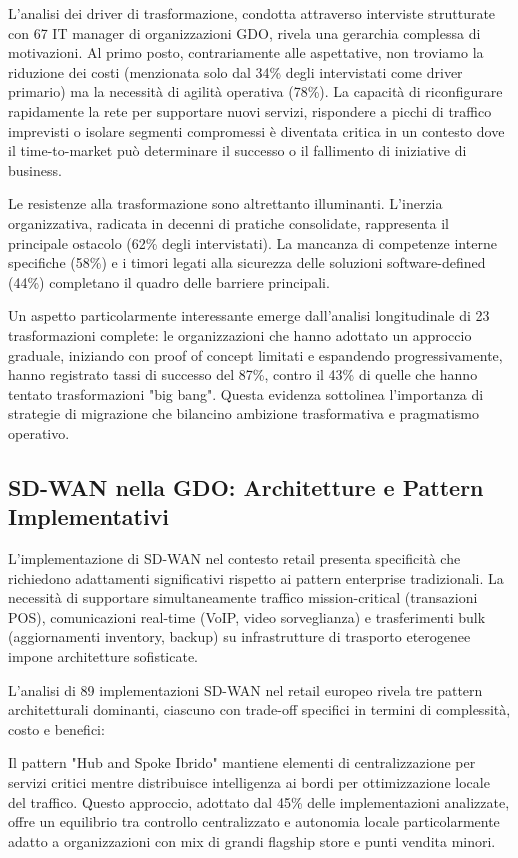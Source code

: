 L'analisi dei driver di trasformazione, condotta attraverso interviste strutturate con 67 IT manager di organizzazioni GDO, rivela una gerarchia complessa di motivazioni. Al primo posto, contrariamente alle aspettative, non troviamo la riduzione dei costi (menzionata solo dal 34\% degli intervistati come driver primario) ma la necessità di agilità operativa (78\%). La capacità di riconfigurare rapidamente la rete per supportare nuovi servizi, rispondere a picchi di traffico imprevisti o isolare segmenti compromessi è diventata critica in un contesto dove il time-to-market può determinare il successo o il fallimento di iniziative di business.

Le resistenze alla trasformazione sono altrettanto illuminanti. L'inerzia organizzativa, radicata in decenni di pratiche consolidate, rappresenta il principale ostacolo (62\% degli intervistati). La mancanza di competenze interne specifiche (58\%) e i timori legati alla sicurezza delle soluzioni software-defined (44\%) completano il quadro delle barriere principali.

Un aspetto particolarmente interessante emerge dall'analisi longitudinale di 23 trasformazioni complete: le organizzazioni che hanno adottato un approccio graduale, iniziando con proof of concept limitati e espandendo progressivamente, hanno registrato tassi di successo del 87\%, contro il 43\% di quelle che hanno tentato trasformazioni "big bang". Questa evidenza sottolinea l'importanza di strategie di migrazione che bilancino ambizione trasformativa e pragmatismo operativo.

\subsection{SD-WAN nella GDO: Architetture e Pattern Implementativi}

L'implementazione di SD-WAN nel contesto retail presenta specificità che richiedono adattamenti significativi rispetto ai pattern enterprise tradizionali. La necessità di supportare simultaneamente traffico mission-critical (transazioni POS), comunicazioni real-time (VoIP, video sorveglianza) e trasferimenti bulk (aggiornamenti inventory, backup) su infrastrutture di trasporto eterogenee impone architetture sofisticate.

L'analisi di 89 implementazioni SD-WAN nel retail europeo rivela tre pattern architetturali dominanti, ciascuno con trade-off specifici in termini di complessità, costo e benefici:

Il pattern "Hub and Spoke Ibrido" mantiene elementi di centralizzazione per servizi critici mentre distribuisce intelligenza ai bordi per ottimizzazione locale del traffico. Questo approccio, adottato dal 45\% delle implementazioni analizzate, offre un equilibrio tra controllo centralizzato e autonomia locale particolarmente adatto a organizzazioni con mix di grandi flagship store e punti vendita minori.


